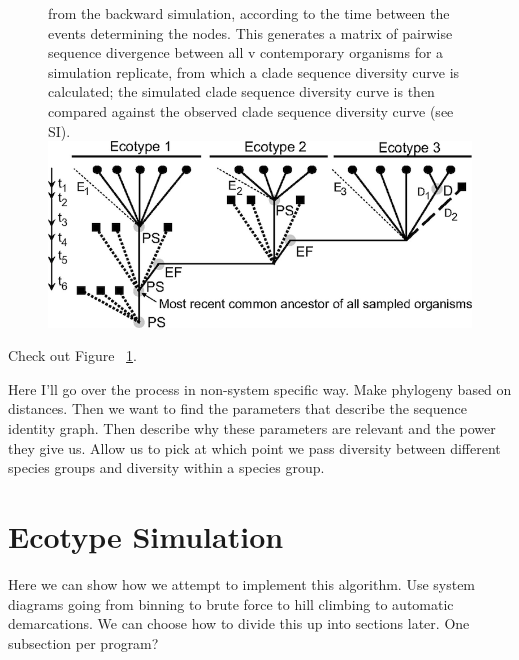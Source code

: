 \begin{figure}[h!]
from the backward simulation, according to the time between the events determining the nodes. This generates a matrix of pairwise sequence divergence between all v contemporary organisms for a simulation replicate, from which a clade sequence diversity curve is calculated; the simulated clade sequence diversity curve is then compared against the observed clade sequence diversity curve (see SI).%
  \centering
  \label{fig:SpeciationGraph}
   \includegraphics{images/Speciation-CH2}
\end{figure}

Check out Figure ~\ref{fig:SpeciationGraph}.

Here I'll go over the process in non-system specific way. Make phylogeny based on distances. Then we want to find the parameters that describe the sequence identity graph. Then describe why these parameters are relevant and the power they give us. Allow us to pick at which point we pass diversity between different species groups and diversity within a species group.
\section{Ecotype Simulation}
Here we can show how we attempt to implement this algorithm. Use system diagrams going from binning to brute force to hill climbing to automatic demarcations. We can choose how to divide this up into sections later. One subsection per program?